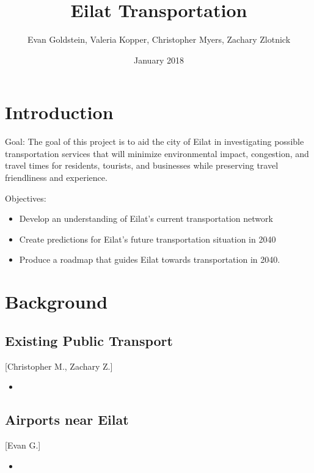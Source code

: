 \documentclass[12pt]{article}                         %
\title{Eilat Transportation}
\author{Evan Goldstein, Valeria Kopper, Christopher Myers, Zachary Zlotnick}
\date{January 2018}
\begin{document}
\maketitle
\newpage

\renewcommand\abstractname{Summary} %

\tableofcontents
\newpage
\listofauthorships
\newpage
{}
\doublespacing

\section{Introduction}

Goal: The goal of this project is to aid the city of Eilat in investigating possible transportation services that will minimize environmental impact, congestion, and travel times for residents, tourists, and businesses while preserving travel friendliness and experience.

Objectives:
\begin{itemize}
    \item Develop an understanding of Eilat's current transportation network
    
    \item Create predictions for Eilat's future transportation situation in 2040
    
    \item Produce a roadmap that guides Eilat towards transportation in 2040.
\end{itemize}

\newpage
\section{Background}

\subsection{Existing Public Transport}[Christopher M., Zachary Z.]
\begin{itemize}
    \item 
\end{itemize}

\subsection{Airports near Eilat}[Evan G.]
\begin{itemize}
    \item 
\end{itemize}
\end{document}
